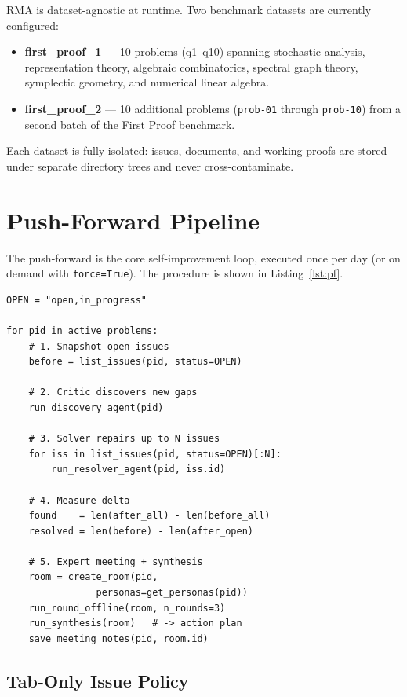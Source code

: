 \documentclass[11pt]{article}
\begin{document}
RMA is dataset-agnostic at runtime. Two benchmark datasets are currently configured:
\begin{itemize}[nosep]
  \item \textbf{first\_proof\_1} --- 10 problems (q1--q10) spanning stochastic analysis,
    representation theory, algebraic combinatorics, spectral graph theory,
    symplectic geometry, and numerical linear algebra.
  \item \textbf{first\_proof\_2} --- 10 additional problems (\texttt{prob-01}
    through \texttt{prob-10}) from a second batch of the First Proof benchmark.
\end{itemize}
Each dataset is fully isolated: issues, documents, and working proofs are stored
under separate directory trees and never cross-contaminate.


\section{Push-Forward Pipeline}
\label{app:pipeline}

The push-forward is the core self-improvement loop, executed once per day
(or on demand with \texttt{force=True}). The procedure is shown in
Listing~\ref{lst:pf}.

\begin{lstlisting}[caption={Push-forward pseudocode.},label={lst:pf}]
OPEN = "open,in_progress"

for pid in active_problems:
    # 1. Snapshot open issues
    before = list_issues(pid, status=OPEN)

    # 2. Critic discovers new gaps
    run_discovery_agent(pid)

    # 3. Solver repairs up to N issues
    for iss in list_issues(pid, status=OPEN)[:N]:
        run_resolver_agent(pid, iss.id)

    # 4. Measure delta
    found    = len(after_all) - len(before_all)
    resolved = len(before) - len(after_open)

    # 5. Expert meeting + synthesis
    room = create_room(pid,
                personas=get_personas(pid))
    run_round_offline(room, n_rounds=3)
    run_synthesis(room)   # -> action plan
    save_meeting_notes(pid, room.id)
\end{lstlisting}

\subsection{Tab-Only Issue Policy}
\end{document}

